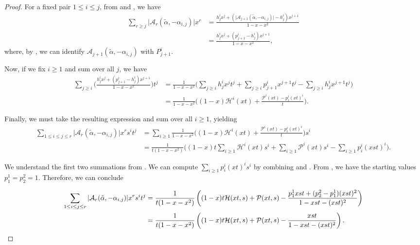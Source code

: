 \documentclass{amsart}
\theoremstyle{definition}
\newcommand{\hroot}{\tilde{\alpha}}
\newcommand{\calP}{\mathcal{P}}
\newcommand{\calH}{\mathcal{H}}
\begin{document}
\begin{proof}
For a fixed pair $1 \leq i\leq j$, from  and , we have 
\begin{align*}
\sum_{r \geq j} \vert \mathcal{A}_r(\hroot, -\alpha_{i,j})\vert x^r
&= \frac{h_j^i x^j + (\vert \mathcal{A}_{j+1}(\hroot, -\alpha_{i,j})\vert - h_j^i)x^{j+1}}{1-x-x^2}\\
&= \frac{h_j^i x^j + (p_{j+1}^i - h_j^i)x^{j+1}}{1-x-x^2},
\end{align*}
where, by , we can identify $\mathcal{A}_{j+1}(\hroot, -\alpha_{i,j})$ with $P_{j+1}^i$. 

Now, if we fix $i \geq 1$ and sum over all $j$, we have 
\begin{align*}
\sum_{j \geq i} \bigg(\frac{h_j^i x^j + (p_{j+1}^i - h_j^i)x^{j+1}}{1-x-x^2}\bigg)t^j
&=\frac{1}{1-x-x^2} \bigg( \sum_{j \geq i} h_j^i x^j t^j + \sum_{j \geq i} p_{j+1}^i x^{j+1}t^j - \sum_{j \geq i} h_j^i x^{j+1}t^j\bigg) \\
&= \frac{1}{1-x-x^2}\bigg((1-x) \calH^i(xt) + \frac{\calP^i(xt) - p_i^i (xt)^i}{t}\bigg).
\end{align*}

Finally, we must take the resulting expression and sum over all $i \geq 1$, yielding \begin{align*}
\sum_{1\leq i\leq j\leq r}\vert \mathcal{A}_r(\hroot, -\alpha_{i,j})\vert x^r s^it^j&=\sum_{i \geq 1}\frac{1}{1-x-x^2}\bigg((1-x) \calH^i(xt) + \frac{\calP^i(xt) - p_i^i (xt)^i}{t}\bigg)s^i \\
&=\frac{1}{t(1-x-x^2)}\bigg((1-x)t \sum_{i \geq 1}\calH^i(xt)s^i + \sum_{i \geq 1}\calP^i(xt)s^i -\sum_{i \geq 1} p_i^i(xst)^i\bigg).
\end{align*}

We understand the first two summations from . We can compute $\sum_{i \geq 1}p_i^i(xt)^is^i$ by combining  and .
From , we have the starting values $p_1^1 = p_2^2 = 1$. Therefore, we can conclude 


\begin{align*}
\sum_{1\leq i\leq j\leq r}\vert \mathcal{A}_r(\hroot, -\alpha_{i,j})\vert x^r s^it^j&=\frac{1}{t(1-x-x^2)}\left((1-x)t\calH(xt,s)+\calP(xt,s)-\frac{p_1^1xst+(p_2^2-p_1^1)(xst)^2}{1-xst-(xst)^2}\right)\\
&= \frac{1}{t(1-x-x^2)}\left((1-x)t\calH(xt,s)+\calP(xt,s)-\frac{xst}{1-xst-(xst)^2}\right).\qedhere
\end{align*}

\end{proof}
\end{document}
